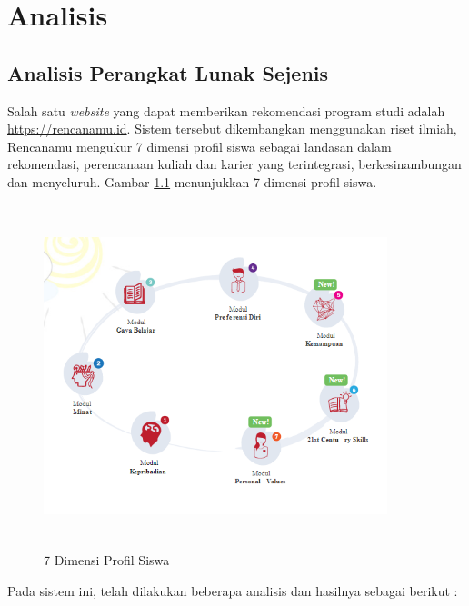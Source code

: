 \chapter{Analisis}
\label{chap:analisis}

\section{Analisis Perangkat Lunak Sejenis}
\label{sec:analisis pl}

Salah satu \textit{website} yang dapat memberikan rekomendasi program studi adalah \url{https://rencanamu.id}. Sistem tersebut dikembangkan menggunakan riset ilmiah, Rencanamu mengukur 7 dimensi profil siswa sebagai landasan dalam rekomendasi, perencanaan kuliah dan karier yang terintegrasi, berkesinambungan dan menyeluruh. Gambar \ref{gambar31} menunjukkan 7 dimensi profil siswa. %

\begin{figure}[H]
    \centering
    \includegraphics[width = 10cm, height = 10cm]{doc/DokumenSkripsi/Gambar/gambar31.PNG}
    \caption{7 Dimensi Profil Siswa}
    \label{gambar31}
\end{figure}

Pada sistem ini, telah dilakukan beberapa analisis dan hasilnya sebagai berikut :

